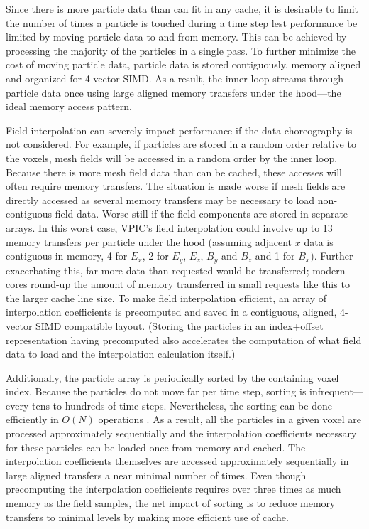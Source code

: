 \documentclass[10pt]{article}
\begin{document}
Since there is more particle data than can fit in any cache, it is
desirable to limit the number of times a particle is touched during a
time step lest performance be limited by moving particle data to and
from memory.  This can be achieved by processing the majority of the
particles in a single pass.  To further minimize the cost of moving
particle data, particle data is stored contiguously, memory aligned
and organized for 4-vector SIMD.  As a result, the inner loop streams
through particle data once using large aligned memory transfers under
the hood---the ideal memory access pattern.

Field interpolation can severely impact performance if the data
choreography is not considered.  For example, if particles are stored
in a random order relative to the voxels, mesh fields will be accessed
in a random order by the inner loop.  Because there is more mesh field
data than can be cached, these accesses will often require memory
transfers.  The situation is made worse if mesh fields are directly
accessed as several memory transfers may be necessary to load
non-contiguous field data.  Worse still if the field components are
stored in separate arrays.  In this worst case, VPIC's field
interpolation could involve up to 13 memory transfers per particle
under the hood (assuming adjacent $x$ data is contiguous in memory, 4
for $E_x$, 2 for $E_y$, $E_z$, $B_y$ and $B_z$ and 1 for $B_x$).
Further exacerbating this, far more data than requested would be
transferred; modern cores round-up the amount of memory transferred in
small requests like this to the larger cache line size.  To make field
interpolation efficient, an array of interpolation coefficients is
precomputed and saved in a contiguous, aligned, 4-vector SIMD
compatible layout.  (Storing the particles in an index+offset
representation having precomputed also accelerates the computation of
what field data to load and the interpolation calculation itself.)

Additionally, the particle array is periodically sorted by the
containing voxel index.  Because the particles do not move far per
time step, sorting is infrequent---every tens to hundreds of time
steps.  Nevertheless, the sorting can be done efficiently in $O(N)$
operations \cite{Bowers_2001}.  As a result, all the particles in a
given voxel are processed approximately sequentially and the
interpolation coefficients necessary for these particles can be loaded
once from memory and cached.  The interpolation coefficients
themselves are accessed approximately sequentially in large aligned
transfers a near minimal number of times.  Even though precomputing
the interpolation coefficients requires over three times as much
memory as the field samples, the net impact of sorting is to reduce
memory transfers to minimal levels by making more efficient use of
cache.
\end{document}
